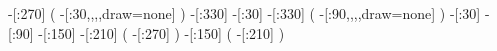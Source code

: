             -[:270]%
                      (
    -[:30,,,,draw=none]%
                      )
            -[:330]%
             -[:30]%
            -[:330]%
                      (
    -[:90,,,,draw=none]%
                      )
             -[:30]%
             -[:90]%
            -[:150]%
            -[:210]%
                      (
                -[:270]%
                      )
            -[:150]%
                      (
                -[:210]%
                      )